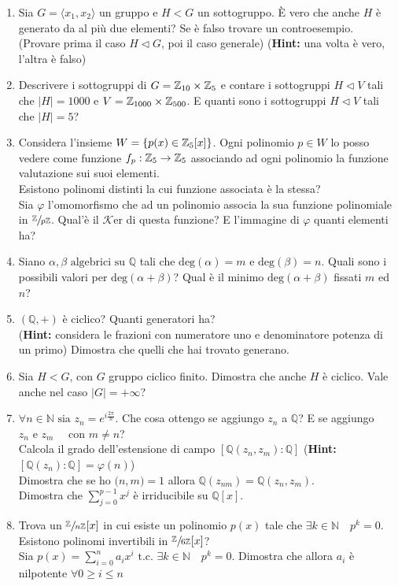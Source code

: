 \documentclass[a4paper,11pt]{article}
\newcommand{\su}[2]{\sfrac{#1}{#2}}
\newcommand{\QQ}{\mathbb{Q}}
\newcommand{\NN}{\mathbb{N}}
\newcommand{\cart}{\times}
\newcommand{\gen}[1]{\langle #1 \rangle}
\newcommand{\tc}{\mbox{ t.c. }}
\newcommand{\Zp}{\su{\mathbb{Z}}{p\mathbb{Z}}}
\newcommand{\Hint}{{\bf Hint: }}
\newcommand{\Ker}{\mathcal{K}\mbox{er} }
\newcommand{\degree}{\mbox{deg}}
\newcommand{\MCD}[2]{\mathcal{(} #1 \mathcal{,} #2 \mathcal{)}}
\begin{document}
\begin{enumerate}
\item Sia $G = \gen{x_1, x_2}$ un gruppo e $H < G$ un sottogruppo. \`E vero che anche $H$ \`e generato da al pi\`u due elementi? Se \`e falso trovare un controesempio. (Provare prima il caso $H \lhd G$, poi il caso generale) (\Hint una volta \`e vero, l'altra \`e falso)
\item Descrivere i sottogruppi di $G = \ZZ{10}\cart\ZZ{5}$ e contare i sottogruppi $H \lhd V$ tali che $\mid H \mid = 1000$ e $V = \ZZ{1000}\cart\ZZ{500}$. E quanti sono i sottogruppi $H \lhd V$ tali che $\mid H \mid = 5$?
\item Considera l'insieme $W = \left\{ p(x) \in \ZZ{5} [x] \right\}$. Ogni polinomio $p \in W$ lo posso vedere come funzione $f_p: \ZZ{5} \rightarrow \ZZ{5}$ associando ad ogni polinomio la funzione valutazione sui suoi elementi. \\ Esistono polinomi distinti la cui funzione associata \`e la stessa? \\ Sia $\varphi$ l'omomorfismo che ad un polinomio associa la sua funzione polinomiale in $\Zp$. Qual'\`e il $\Ker$ di questa funzione? E l'immagine di $\varphi$ quanti elementi ha?
\item Siano $\alpha, \beta \mbox{ algebrici su } \QQ$ tali che $\degree(\alpha) = m$ e $\degree(\beta) = n$. Quali sono i possibili valori per $\degree(\alpha + \beta)$? Qual \`e il minimo $\degree(\alpha + \beta)$ fissati $m$ ed $n$?
\item $(\QQ, +)$ \`e ciclico? Quanti generatori ha? \\ (\Hint considera le frazioni con numeratore uno e denominatore potenza di un primo) Dimostra che quelli che hai trovato generano.
\item Sia $H < G$, con $G$ gruppo ciclico finito. Dimostra che anche $H$ \`e ciclico. Vale anche nel caso $\mid G \mid = +\infty$?
\item $\forall n \in \NN \mbox{ sia } z_n = e^{i\frac{2\pi}{n}}$. Che cosa ottengo se aggiungo $z_n$ a $\QQ$? E se aggiungo $z_n \mbox{ e } z_m \quad \mbox{ con } m \neq n$? \\ Calcola il grado dell'estensione di campo $\left[ \QQ (z_n, z_m) : \QQ \right]$ (\Hint $\left[ \QQ(z_n) : \QQ \right] = \varphi(n)$) \\ Dimostra che se ho $\MCD{n}{m} = 1$ allora $\QQ(z_{nm}) = \QQ(z_n, z_m)$. \\ Dimostra che $\sum_{j=0}^{p-1} x^j$ \`e irriducibile su $\QQ[x]$.
\item Trova un $\su{\ZZ{}}{n\ZZ{}}[x]$ in cui esiste un polinomio $p(x)$ tale che $\exists k \in \NN \quad p^k = 0$. Esistono polinomi invertibili in $\su{\ZZ{}}{6\ZZ{}}[x]$? \\ Sia $p(x) = \sum_{i=0}^{n} a_i x^i \tc \exists k \in \NN \quad p^k=0$. Dimostra che allora $a_i$ \`e nilpotente $\forall 0 \ge i \le n$

\end{enumerate}
\end{document}
